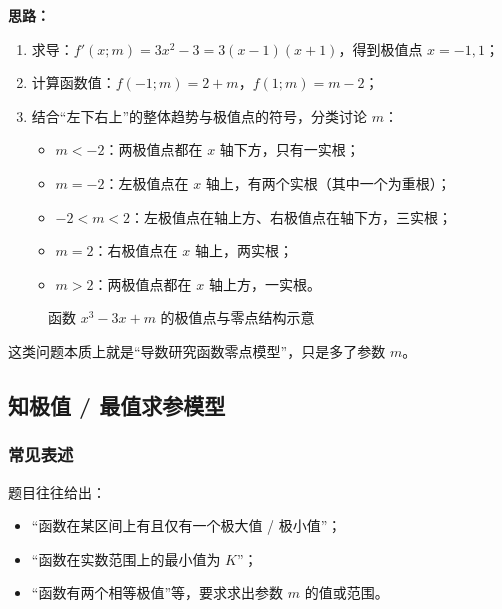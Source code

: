 \documentclass[a4paper,11pt]{ctexart}
\begin{document}
\textbf{思路：}
\begin{enumerate}
  \item 求导：$f'(x;m)=3x^2-3=3(x-1)(x+1)$，得到极值点 $x=-1,1$；
  \item 计算函数值：$f(-1;m)=2+m$，$f(1;m)=m-2$；
  \item 结合“左下右上”的整体趋势与极值点的符号，分类讨论 $m$：
    \begin{itemize}
      \item $m<-2$：两极值点都在 $x$ 轴下方，只有一实根；
      \item $m=-2$：左极值点在 $x$ 轴上，有两个实根（其中一个为重根）；
      \item $-2<m<2$：左极值点在轴上方、右极值点在轴下方，三实根；
      \item $m=2$：右极值点在 $x$ 轴上，两实根；
      \item $m>2$：两极值点都在 $x$ 轴上方，一实根。
    \end{itemize}
\end{enumerate}

\begin{figure}[htbp]
  \centering
  \caption{函数 $x^3-3x+m$ 的极值点与零点结构示意}
\end{figure}

这类问题本质上就是“导数研究函数零点模型”，只是多了参数 $m$。

\subsection{知极值 / 最值求参模型}

\subsubsection{常见表述}

题目往往给出：
\begin{itemize}
  \item “函数在某区间上有且仅有一个极大值 / 极小值”；
  \item “函数在实数范围上的最小值为 $K$”；
  \item “函数有两个相等极值”等，要求求出参数 $m$ 的值或范围。
\end{itemize}
\end{document}
